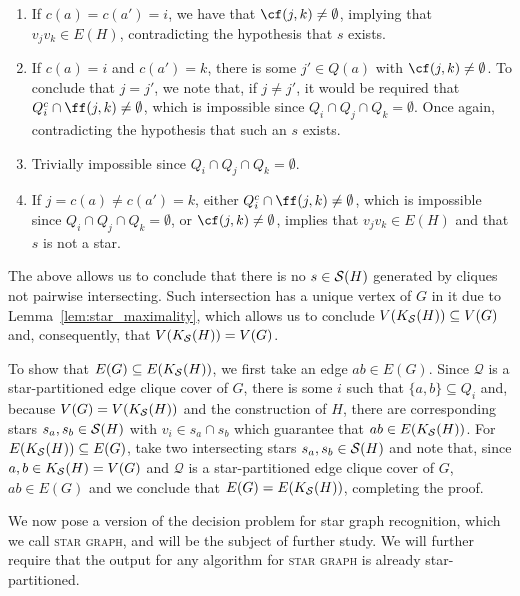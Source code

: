 \begin{tproof}
    \begin{enumerate}
        \item If $c(a) = c(a') = i$, we have that $\cf(j,k)  \neq \emptyset$, implying that $v_jv_k \in E(H)$, contradicting the hypothesis that $s$ exists.
        \item If $c(a) = i$ and $c(a') = k$, there is some $j' \in Q(a)$ with $\cf(j,k) \neq \emptyset$. To conclude that $j = j'$, we note that, if $j \neq j'$, it would be required that $Q_i^c \cap \ff(j,k) \neq \emptyset$, which is impossible since $Q_i \cap Q_j \cap Q_k = \emptyset$.
        Once again, contradicting the hypothesis that such an $s$ exists.
        \item Trivially impossible since $Q_i \cap Q_j \cap Q_k = \emptyset$.
        \item If $j = c(a) \neq c(a') = k$, either $Q_i^c \cap \ff(j,k) \neq \emptyset$, which is impossible since $Q_i \cap Q_j \cap Q_k = \emptyset$, or $\cf(j,k) \neq \emptyset$, implies that $v_jv_k \in E(H)$ and that $s$ is not a star.
    \end{enumerate}
    
    The above allows us to conclude that there is no $s \in \mathcal{S}(H)$ generated by cliques not pairwise intersecting.
    Such intersection has a unique vertex of $G$ in it due to Lemma~\ref{lem:star_maximality}, which allows us to conclude $V(K_{\mathcal{S}}(H)) \subseteq V(G)$ and, consequently, that $V(K_{\mathcal{S}}(H)) = V(G)$.
    
    To show that $E(G) \subseteq E(K_{\mathcal{S}}(H))$, we first take an edge $ab \in E(G)$.
    Since $\mathcal{Q}$ is a star-partitioned edge clique cover of $G$, there is some $i$ such that $\{a,b\} \subseteq Q_i$ and, because $V(G) = V(K_{\mathcal{S}}(H))$ and the construction of $H$, there are corresponding stars $s_a, s_b \in \mathcal{S}(H)$ with $v_i \in s_a \cap s_b$ which guarantee that $ab \in E(K_{\mathcal{S}}(H))$.
    For $E(K_{\mathcal{S}}(H)) \subseteq E(G)$, take two intersecting stars $s_a,s_b \in \mathcal{S}(H)$ and note that, since $a,b \in K_{\mathcal{S}}(H) = V(G)$ and $\mathcal{Q}$ is a star-partitioned edge clique cover of $G$, $ab \in E(G)$ and we conclude that $E(G) = E(K_{\mathcal{S}}(H))$, completing the proof.
\end{tproof}

We now pose a version of the decision problem for star graph recognition, which we call \textsc{star graph}, and will be the subject of further study.
We will further require that the output for any algorithm for \textsc{star graph} is already star-partitioned.


